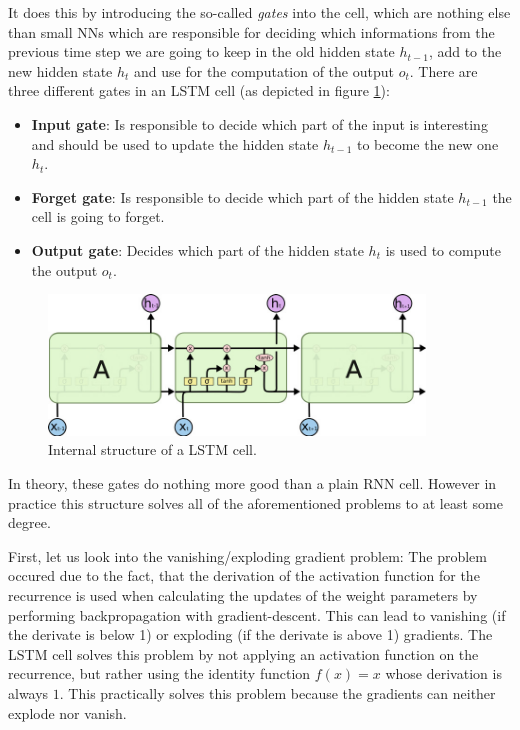 It does this by introducing the so-called \emph{gates} into the cell, which are nothing else than small NNs which are responsible for deciding which informations from the previous time step we are going to keep in the old hidden state $h_{t-1}$, add to the new hidden state $h_t$ and use for the computation of the output $o_t$. There are three different gates in an LSTM cell (as depicted in figure \ref{fundamentals:lstm:internal_structure}):

\begin{itemize}
	\item \textbf{Input gate}: Is responsible to decide which part of the input is interesting and should be used to update the hidden state $h_{t-1}$ to become the new one $h_t$.
	\item \textbf{Forget gate}: Is responsible to decide which part of the hidden state $h_{t-1}$ the cell is going to forget.
	\item \textbf{Output gate}: Decides which part of the hidden state $h_t$ is used to compute the output $o_t$.
\end{itemize}

\begin{figure}[h]
	\label{fundamentals:lstm:internal_structure}
	\centering
	\includegraphics[width=10cm]{img/lstm_internal}
	\caption{Internal structure of a LSTM cell.\protect\footnotemark}
\end{figure}

In theory, these gates do nothing more good than a plain RNN cell. However in practice this structure solves all of the aforementioned problems to at least some degree.

First, let us look into the vanishing/exploding gradient problem: The problem occured due to the fact, that the derivation of the activation function for the recurrence is used when calculating the updates of the weight parameters by performing backpropagation with gradient-descent. This can lead to vanishing (if the derivate is below 1) or exploding (if the derivate is above 1) gradients. The LSTM cell solves this problem by not applying an activation function on the recurrence, but rather using the identity function $f(x) = x$ whose derivation is always $1$. This practically solves this problem because the gradients can neither explode nor vanish.

